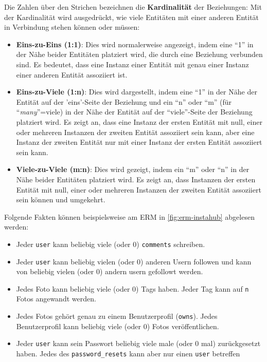 Die Zahlen über den Strichen bezeichnen die \textbf{Kardinalität} der Beziehungen: Mit der Kardinalität wird ausgedrückt, wie viele Entitäten mit einer anderen Entität in Verbindung stehen können oder müssen:
\begin{itemize}
  \item \textbf{Eins-zu-Eins (1:1)}: Dies wird normalerweise angezeigt, indem eine ``1'' in der Nähe beider Entitäten platziert wird, die durch eine Beziehung verbunden sind. Es bedeutet, dass eine Instanz einer Entität mit genau einer Instanz einer anderen Entität assoziiert ist.
  \item \textbf{Eins-zu-Viele (1:n)}: Dies wird dargestellt, indem eine ``1'' in der Nähe der Entität auf der 'eins'-Seite der Beziehung und ein ``n'' oder ``m'' (für ``\textit{many}''=viele) in der Nähe der Entität auf der ``viele''-Seite der Beziehung platziert wird. Es zeigt an, dass eine Instanz der ersten Entität mit null, einer oder mehreren Instanzen der zweiten Entität assoziiert sein kann, aber eine Instanz der zweiten Entität nur mit einer Instanz der ersten Entität assoziiert sein kann.
  \item \textbf{Viele-zu-Viele (m:n)}: Dies wird gezeigt, indem ein ``m'' oder ``n'' in der Nähe beider Entitäten platziert wird. Es zeigt an, dass Instanzen der ersten Entität mit null, einer oder mehreren Instanzen der zweiten Entität assoziiert sein können und umgekehrt.
\end{itemize}

Folgende Fakten können beispielsweise am \gls{ERM} in \cref{fig:erm-instahub} abgelesen werden:
\begin{itemize}
  \item Jeder \texttt{user} kann beliebig viele (oder 0) \texttt{comments} schreiben.
  \item Jeder \texttt{user} kann beliebig vielen (oder 0) anderen Usern followen und kann von beliebig vielen (oder 0) andern usern gefollowt werden.
  \item Jedes Foto kann beliebig viele (oder 0) Tags haben. Jeder Tag kann auf \texttt{n} Fotos angewandt werden.
  \item Jedes Fotos gehört genau zu einem Benutzerprofil (\texttt{owns}). Jedes Benutzerprofil kann beliebig viele (oder 0) Fotos veröffentlichen.
  \item Jeder \texttt{user} kann sein Passwort beliebig viele male (oder 0 mal) zurückgesetzt haben. Jedes des \texttt{password\_resets} kann aber nur einen \texttt{user} betreffen
\end{itemize}


